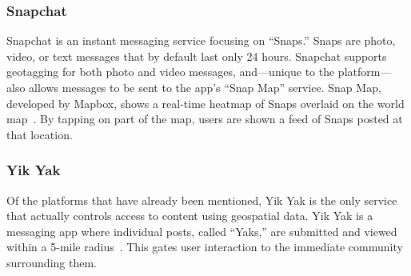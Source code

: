 \subsubsection{Snapchat}

Snapchat is an instant messaging service focusing on \enquote{Snaps.} Snaps are photo, video, or text messages that by default last only 24 hours. Snapchat supports geotagging for both photo and video messages, and—unique to the platform—also allows messages to be sent to the app's \enquote{Snap Map} service. Snap Map, developed by Mapbox, shows a real-time heatmap of Snaps overlaid on the world map~\cite{tadesse_2017}. By tapping on part of the map, users are shown a feed of Snaps posted at that location.

\subsubsection{Yik Yak}

Of the platforms that have already been mentioned, Yik Yak is the only service that actually controls access to content using geospatial data. Yik Yak is a messaging app where individual posts, called \enquote{Yaks,} are submitted and viewed within a 5-mile radius~\cite{yikyak_2015}. This gates user interaction to the immediate community surrounding them.
